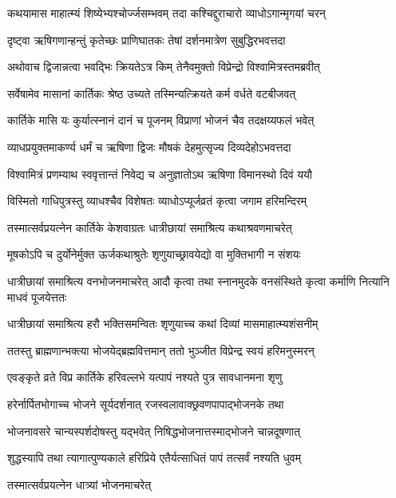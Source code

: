 \twolineshloka
{कथयामास माहात्म्यं शिष्येभ्यश्चोर्ज्जसम्भवम्}
{तदा कश्चिद्दुराचारो व्याधोऽगान्मृगयां चरन्} %

\twolineshloka
{दृष्ट्वा ऋषिगणान्हन्तुं कृतेच्छः प्राणिघातकः}
{तेषां दर्शनमात्रेण सुबुद्धिरभवत्तदा} %

\twolineshloka
{अथोवाच द्विजान्नत्वा भवद्भिः क्रियतेऽत्र किम्}
{तेनैवमुक्तो विप्रेन्द्रो विश्वामित्रस्तमब्रवीत्} %


\twolineshloka
{सर्वेषामेव मासानां कार्तिकः श्रेष्ठ उच्यते}
{तस्मिन्यत्क्रियते कर्म वर्धते वटबीजवत्} %

\twolineshloka
{कार्तिके मासि यः कुर्यात्स्नानं दानं च पूजनम्}
{विप्राणां भोजनं चैव तदक्षय्यफलं भवेत्} %

\twolineshloka
{व्याधप्रयुक्तमाकर्ण्य धर्मं च ऋषिणा द्विजः}
{मौषकं देहमुत्सृज्य दिव्यदेहोऽभवत्तदा} %

\twolineshloka
{विश्वामित्रं प्रणम्याथ स्ववृत्तान्तं निवेद्य च}
{अनुज्ञातोऽथ ऋषिणा विमानस्थो दिवं ययौ} %

\twolineshloka
{विस्मितो गाधिपुत्रस्तु व्याधश्चैव विशेषतः}
{व्याधोऽप्यूर्जव्रतं कृत्वा जगाम हरिमन्दिरम्} %

\twolineshloka
{तस्मात्सर्वप्रयत्नेन कार्तिके केशवाग्रतः}
{धात्रीछायां समाश्रित्य कथाश्रवणमाचरेत्} %

\twolineshloka
{मूषकोऽपि च दुर्योनेर्मुक्त ऊर्जकथाश्रुतेः}
{शृणुयाच्छ्रावयेद्यो वा मुक्तिभागी न संशयः} %

\threelineshloka
{धात्रीछायां समाश्रित्य वनभोजनमाचरेत्}
{आदौ कृत्वा तथा स्नानमुदके वनसंस्थिते}
{कृत्वा कर्माणि नित्यानि माधवं पूजयेत्ततः} %

\twolineshloka
{धात्रीछायां समाश्रित्य हरौ भक्तिसमन्वितः}
{शृणुयाच्च कथां दिव्यां मासमाहात्म्यशंसनीम्} %

\twolineshloka
{ततस्तु ब्राह्मणान्भक्त्या भोजयेद्ब्रह्मवित्तमान्}
{ततो भुञ्जीत विप्रेन्द्र स्वयं हरिमनुस्मरन्} %

\twolineshloka
{एवङ्कृते व्रते विप्र कार्तिके हरिवल्लभे}
{यत्पापं नश्यते पुत्र सावधानमना शृणु} %

\twolineshloka
{हरेर्नार्पितभोगाच्च भोजने सूर्यदर्शनात्}
{रजस्वलावाक्छ्रवणपापाद्भोजनके तथा} %

\twolineshloka
{भोजनावसरे चान्यस्पर्शदोषस्तु यद्भवेत्}
{निषिद्धभोजनात्तस्माद्भोजने चान्नदूषणात्} %

\twolineshloka
{शुद्धस्यापि तथा त्यागात्पुण्यकाले हरिप्रिये}
{एतैर्यत्साधितं पापं तत्सर्वं नश्यति धुवम्} %


\onelineshloka
{तस्मात्सर्वप्रयत्नेन धात्र्यां भोजनमाचरेत्} %

